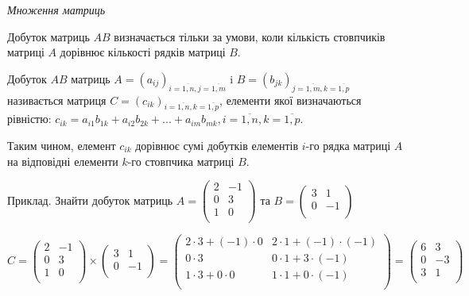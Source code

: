 \textit{Множення матриць}

Добуток матриць $A B$ визначається тільки за умови, коли кількість
стовпчиків матриці $A$ дорівнює кількості рядків матриці $B$.

\begin{definition}
	Добуток $A B$ матриць $A = (a_{ij})_{i=\overline{1,n}, j=\overline{1,m}}$ i $B = (b_{jk})_{j=\overline{1,m}, k=\overline{1,p}}$
	називається матриця $C = (c_{ik})_{i=\overline{1,n}, k=\overline{1,p}}$, елементи якої визначаються рівністю:
	$c_{ik} = a_{i1}b_{1k} + a_{i2}b_{2k} + ... + a_{im}b_{mk}, i = \overline{1,n}, k = \overline{1,p}$.
\end{definition}

Таким чином, елемент $c_{ik}$ дорівнює сумі добутків елементів $i$-го рядка
матриці $A$ на відповідні елементи $k$-го стовпчика матриці $B$.

\begin{example}
Приклад. Знайти добуток матриць
$A = \begin{pmatrix}
	2 & -1 \\
	0 & 3 \\
	1 & 0 \\
\end{pmatrix}$ та $B = \begin{pmatrix}
	3 & 1 \\
	0 & -1 \\
\end{pmatrix}$

$C = \begin{pmatrix}
	2 & -1 \\
	0 & 3 \\
	1 & 0 \\
\end{pmatrix} \times \begin{pmatrix}
	3 & 1 \\
	0 & -1 \\
\end{pmatrix} = \begin{pmatrix}
	2 \cdot 3 + (-1) \cdot 0 	& 2 \cdot 1 + (-1) \cdot (-1) \\
	0 \cdot 3 					& 0 \cdot 1 + 3 \cdot (-1) \\
	1 \cdot 3 + 0 \cdot 0 		& 1 \cdot 1 + 0 \cdot (-1) \\
\end{pmatrix} = \begin{pmatrix}
	6 & 3 \\
	0 & -3 \\
	3 & 1 \\
\end{pmatrix}$
\end{example}

